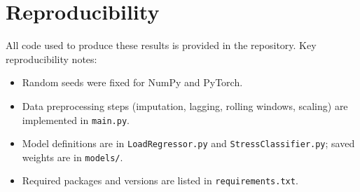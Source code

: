 \documentclass[11pt]{article}
\begin{document}
\section*{Reproducibility}
All code used to produce these results is provided in the repository. Key reproducibility notes:
\begin{itemize}
    \item Random seeds were fixed for NumPy and PyTorch.
    \item Data preprocessing steps (imputation, lagging, rolling windows, scaling) are implemented in \texttt{main.py}.
    \item Model definitions are in \texttt{LoadRegressor.py} and \texttt{StressClassifier.py}; saved weights are in \texttt{models/}.
    \item Required packages and versions are listed in \texttt{requirements.txt}.
\end{itemize}



\end{document}
